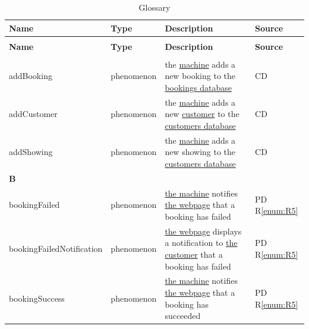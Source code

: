 \documentclass[a4paper,10pt,titlepage,bibtotoc,bibtotocnumbered]{scrreprt}
\begin{document}
\begin{longtable}{|l|p{3cm}|p{5cm}|l|}
\caption{Glossary}
\label{table:glossar}\\
\hline
\rowcolor{black!25}\textbf{Name} & \textbf{Type} & \textbf{Description} & \textbf{Source}\\
\hline
\endfirsthead
\caption[]{Glossary}\\
\hline
\rowcolor{black!25}\textbf{Name} & \textbf{Type} & \textbf{Description} & \textbf{Source}\\
\endhead
\hline
\endfoot
\multicolumn{4}{|l|}{\textbf{A}}\\
\hline
\hypertarget{glossary:addBooking}{addBooking} & phenomenon & the \hyperlink{glossary:UDEKino}{machine} adds a new booking to the \hyperlink{glossary:BookingsDatabase}{bookings database} & CD\\
\hline
\hypertarget{glossary:addCustomer}{addCustomer} & phenomenon & the \hyperlink{glossary:UDEKino}{machine} adds a new \hyperlink{glossary:Customer}{customer} to the \hyperlink{glossary:CustomersDatabase}{customers database} & CD\\
\hline
\hypertarget{glossary:addShowing}{addShowing} & phenomenon & the \hyperlink{glossary:UDEKino}{machine} adds a new showing to the \hyperlink{glossary:ShowingsDatabase}{customers database} & CD\\
\hline
\multicolumn{4}{|l|}{\textbf{B}}\\
\hline
\hypertarget{glossary:bookingFailed}{bookingFailed} & phenomenon & \hyperlink{glossary:UDEKino}{the machine} notifies \hyperlink{glossary:WebpageBookTickets}{the webpage} that a booking has failed & PD R\ref{enum:R5}\\
\hline
\hypertarget{glossary:bookingFailedNotification}{bookingFailedNotification} & phenomenon & \hyperlink{glossary:WebpageBookTickets}{the webpage} displays a notification to \hyperlink{glossary:Customer}{the customer} that a booking has failed & PD R\ref{enum:R5}\\
\hline
\hypertarget{glossary:bookingSuccess}{bookingSuccess} & phenomenon & \hyperlink{glossary:UDEKino}{the machine} notifies \hyperlink{glossary:WebpageBookTickets}{the webpage} that a booking has succeeded & PD R\ref{enum:R5}\\

\end{longtable}
\end{document}
